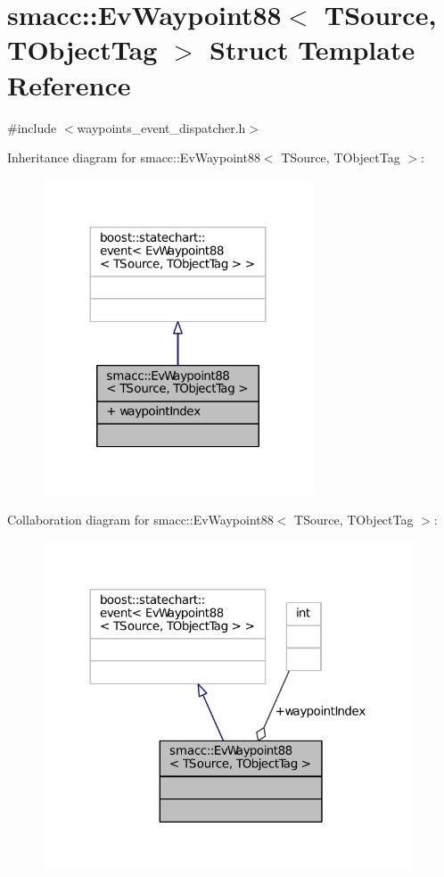 \hypertarget{structsmacc_1_1EvWaypoint88}{}\section{smacc\+:\+:Ev\+Waypoint88$<$ T\+Source, T\+Object\+Tag $>$ Struct Template Reference}
\label{structsmacc_1_1EvWaypoint88}


{\ttfamily \#include $<$waypoints\+\_\+event\+\_\+dispatcher.\+h$>$}



Inheritance diagram for smacc\+:\+:Ev\+Waypoint88$<$ T\+Source, T\+Object\+Tag $>$\+:
\nopagebreak
\begin{figure}[H]
\begin{center}
\leavevmode
\includegraphics[width=227pt]{structsmacc_1_1EvWaypoint88__inherit__graph}
\end{center}
\end{figure}


Collaboration diagram for smacc\+:\+:Ev\+Waypoint88$<$ T\+Source, T\+Object\+Tag $>$\+:
\nopagebreak
\begin{figure}[H]
\begin{center}
\leavevmode
\includegraphics[width=312pt]{structsmacc_1_1EvWaypoint88__coll__graph}
\end{center}
\end{figure}
